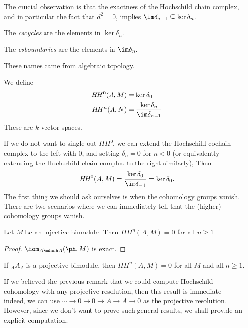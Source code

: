 \documentclass[a4paper]{article}
\newcommand\HH{H\!H}
\begin{document}
The crucial observation is that the exactness of the Hochschild chain complex, and in particular the fact that $d^2 = 0$, implies $\im \delta_{n - 1} \subseteq \ker \delta_n$.
\begin{defi}[Cocycles]
  The \emph{cocycles} are the elements in $\ker \delta_n$.
\end{defi}

\begin{defi}[Coboundaries]
  The \emph{coboundaries} are the elements in $\im \delta_n$.
\end{defi}
These names came from algebraic topology.

\begin{defi}\index{$\HH^n(A, M)$}
  We define
  \begin{align*}
    \HH^0(A, M) &= \ker \delta_0\\
    \HH^n(A, N) &= \frac{\ker \delta_n}{\im \delta_{n - 1}}
  \end{align*}
  These are $k$-vector spaces.
\end{defi}
If we do not want to single out $\HH^0$, we can extend the Hochschild cochain complex to the left with $0$, and setting $\delta_n = 0$ for $n < 0$ (or equivalently extending the Hochschild chain complex to the right similarly), Then
\[
  \HH^0(A, M) = \frac{\ker \delta_0}{\im \delta_{-1}} = \ker \delta_0.
\]
The first thing we should ask ourselves is when the cohomology groups vanish. There are two scenarios where we can immediately tell that the (higher) cohomology groups vanish.

\begin{lemma}
  Let $M$ be an injective bimodule. Then $\HH^n(A, M) = 0$ for all $n \geq 1$.
\end{lemma}

\begin{proof}
  $\Hom_{A\mdash A}(\ph, M)$ is exact.
\end{proof}

\begin{lemma}
  If $_AA_A$ is a projective bimodule, then $\HH^n(A, M) = 0$ for all $M$ and all $n \geq 1$.
\end{lemma}
If we believed the previous remark that we could compute Hochschild cohomology with any projective resolution, then this result is immediate --- indeed, we can use $\cdots \to 0 \to 0 \to A \to A \to 0$ as the projective resolution. However, since we don't want to prove such general results, we shall provide an explicit computation.
\end{document}
